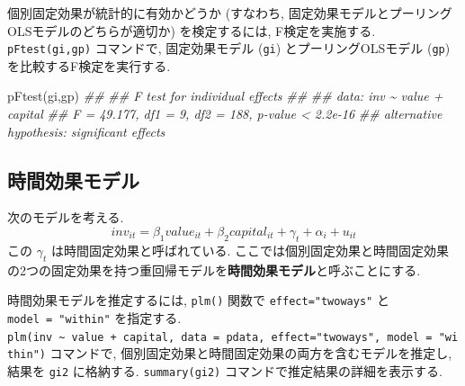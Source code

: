 \documentclass[
  letterpaper,
  xelatex,
  ja=standard, xelatex]{bxjsbook}
\newenvironment{Shaded}{\begin{snugshade}}{\end{snugshade}}
\newcommand{\DocumentationTok}[1]{\textcolor[rgb]{0.37,0.37,0.37}{\textit{#1}}}
\newcommand{\FunctionTok}[1]{\textcolor[rgb]{0.28,0.35,0.67}{#1}}
\newcommand{\NormalTok}[1]{\textcolor[rgb]{0.00,0.23,0.31}{#1}}
\begin{document}
個別固定効果が統計的に有効かどうか (すなわち,
固定効果モデルとプーリングOLSモデルのどちらが適切か) を検定するには,
F検定を実施する. \texttt{pFtest(gi,gp)} コマンドで, 固定効果モデル
(\texttt{gi}) とプーリングOLSモデル (\texttt{gp})
を比較するF検定を実行する.

\begin{Shaded}
\begin{Highlighting}[]
\FunctionTok{pFtest}\NormalTok{(gi,gp)}
\DocumentationTok{\#\# }
\DocumentationTok{\#\#  F test for individual effects}
\DocumentationTok{\#\# }
\DocumentationTok{\#\# data:  inv \textasciitilde{} value + capital}
\DocumentationTok{\#\# F = 49.177, df1 = 9, df2 = 188, p{-}value \textless{} 2.2e{-}16}
\DocumentationTok{\#\# alternative hypothesis: significant effects}
\end{Highlighting}
\end{Shaded}

\subsection{時間効果モデル}\label{ux6642ux9593ux52b9ux679cux30e2ux30c7ux30eb}

次のモデルを考える. \[
inv_{it} = \beta_1 value_{it} + \beta_2 capital_{it}+ \gamma_t +\alpha_i + u_{it}
\] この \(\gamma_t\) は時間固定効果と呼ばれている.
ここでは個別固定効果と時間固定効果の2つの固定効果を持つ重回帰モデルを\textbf{時間効果モデル}と呼ぶことにする.

時間効果モデルを推定するには, \texttt{plm()} 関数で
\texttt{effect="twoways"} と \texttt{model\ =\ "within"} を指定する.
\texttt{plm(inv\ \textasciitilde{}\ value\ +\ capital,\ data\ =\ pdata,\ effect="twoways",\ model\ =\ "within")}
コマンドで, 個別固定効果と時間固定効果の両方を含むモデルを推定し, 結果を
\texttt{gi2} に格納する. \texttt{summary(gi2)}
コマンドで推定結果の詳細を表示する.
\end{document}
